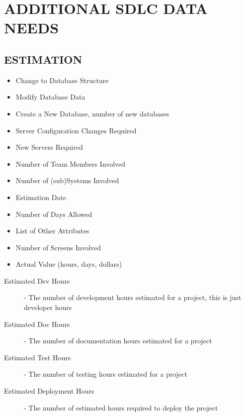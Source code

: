\documentclass[SDSUThesis.tex]{subfiles}
\begin{document}
\section{ADDITIONAL SDLC DATA NEEDS}

    \subsection{ESTIMATION}
    
    \begin{itemize}
    \item Change to Database Structure  
    \item Modify Database Data    
    \item Create a New Database, number of new databases  
    \item Server Configuration Changes Required   
    \item New Servers Required   
    \item Number of Team Members Involved  
    \item Number of (sub)Systems Involved  
    \item Estimation Date
    \item Number of Days Allowed
    \item List of Other Attributes
    \item Number of Screens Involved 
    \item Actual Value (hours, days, dollars) 
    \end{itemize}
    
    
    \begin{description}
        \item[Estimated Dev Hours] - 
            The number of development hours estimated for a 
            project, this is just developer hours
        \item[Estimated Doc Hours] - 
            The number of documentation hours estimated for a project
        \item[Estimated Test Hours] - 
            The number of testing hours estimated for a project
        \item[Estimated Deployment Hours] - 
            The number of estimated hours required to 
            deploy the project
    \end{description}
    
\end{document}
